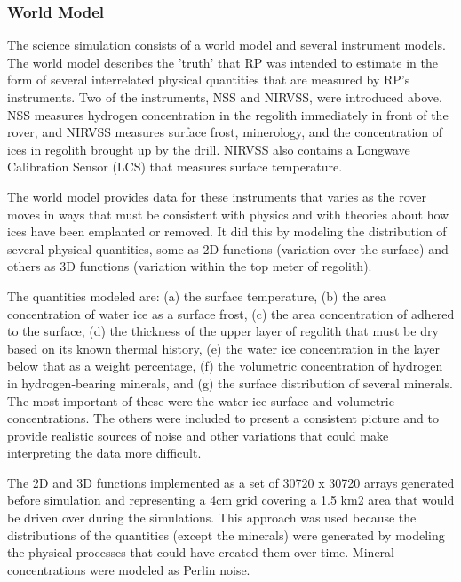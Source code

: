 \documentclass[twocolumn,letterpaper]{IEEEAerospaceCLS}  %
\begin{document}
\subsubsection{World Model}
The science simulation consists of a world model and several instrument models.  
The world model describes the 'truth' that RP was intended to estimate in the form of several interrelated physical quantities that are measured by RP's instruments.  
Two of the instruments, NSS and NIRVSS, were introduced above.  
NSS measures hydrogen concentration in the regolith immediately in front of the rover, and NIRVSS measures surface frost, minerology, and the concentration of ices in regolith brought up by the drill.  
NIRVSS also contains a Longwave Calibration Sensor (LCS) that measures surface temperature.

The world model provides data for these instruments that varies as the rover moves in ways that must be consistent with physics and with theories about how ices have been emplanted or removed.  
It did this by modeling the distribution of several physical quantities, some as 2D functions (variation over the surface) and others as 3D functions (variation within the top meter of regolith).

The quantities modeled are: (a) the surface temperature, (b) the area concentration of water ice as a surface frost, (c) the area concentration of  adhered to the surface, (d) the thickness of the upper layer of regolith that must be dry based on its known thermal history, (e) the water ice concentration in the layer below that as a weight percentage, (f) the volumetric concentration of hydrogen in hydrogen-bearing minerals, and (g) the surface distribution of several minerals.  
The most important of these were the water ice surface and volumetric concentrations.  
The others were included to present a consistent picture and to provide realistic sources of noise and other variations that could make interpreting the data more difficult.

The 2D and 3D functions implemented as a set of 30720 x 30720 arrays generated before simulation and representing a 4cm grid covering a 1.5 km2 area that would be driven over during the simulations.  
This approach was used because the distributions of the quantities (except the minerals) were generated by modeling the physical processes that could have created them over time.  
Mineral concentrations were modeled as Perlin noise.
\end{document}
